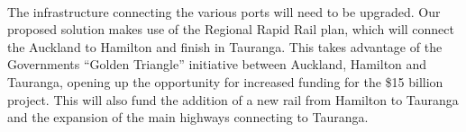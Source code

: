 \vspace{-4mm}
\\\newline The infrastructure connecting the various ports will need to be upgraded. Our proposed solution makes use of the Regional Rapid Rail plan, which will connect the Auckland to Hamilton and finish in Tauranga. This takes advantage of the Governments “Golden Triangle” initiative between Auckland, Hamilton and Tauranga, opening up the opportunity for increased funding for the \$15 billion project. This will also fund the addition of a new rail from Hamilton to Tauranga and the expansion of the main highways connecting to Tauranga.


\clearpage